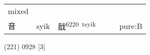 \documentclass[14pt,a4paper]{scrartcl}
\begin{document}
\begin{longtable}[c]{@{}llllll@{}}
\begin{minipage}[t]{0.14\columnwidth}
mixed
\strut\end{minipage}\tabularnewline
\begin{minipage}[t]{0.14\columnwidth}\raggedright\strut
音
\strut\end{minipage} &
\begin{minipage}[t]{0.14\columnwidth}\raggedright\strut
syik
\strut\end{minipage} &
\begin{minipage}[t]{0.14\columnwidth}\raggedright\strut
戠\textsuperscript{6220~tsyik}
\strut\end{minipage} &
\begin{minipage}[t]{0.14\columnwidth}\raggedright\strut
\strut\end{minipage} &
\begin{minipage}[t]{0.14\columnwidth}\raggedright\strut
\strut\end{minipage} &
\begin{minipage}[t]{0.14\columnwidth}\raggedright\strut
pure:B
\strut\end{minipage}\tabularnewline
\bottomrule
\end{longtable}

(221) 0928 {[}3{]}
\end{document}
